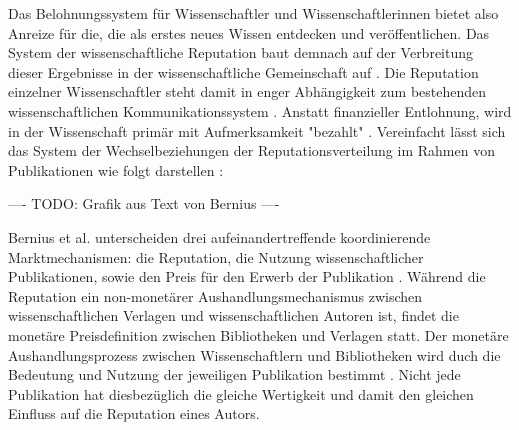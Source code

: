 Das Belohnungssystem für Wissenschaftler und Wissenschaftlerinnen bietet also Anreize für die, die als erstes neues Wissen entdecken und veröffentlichen. Das System der wissenschaftliche Reputation baut demnach auf der Verbreitung dieser Ergebnisse in der wissenschaftliche Gemeinschaft auf \cite{Fabrizio_2008}. Die Reputation einzelner Wissenschaftler steht damit in enger Abhängigkeit zum bestehenden wissenschaftlichen Kommunikationssystem \cite{suchen}. Anstatt finanzieller Entlohnung, wird in der Wissenschaft primär mit Aufmerksamkeit "bezahlt" \cite{suchen}. Vereinfacht lässt sich das System der Wechselbeziehungen der Reputationsverteilung im Rahmen von Publikationen wie folgt darstellen \cite{cite:21a}:

---- TODO: Grafik aus Text von Bernius ----

Bernius et al. unterscheiden drei aufeinandertreffende koordinierende Marktmechanismen: die Reputation, die Nutzung wissenschaftlicher Publikationen, sowie den Preis für den Erwerb der Publikation \cite{suchen}. Während die Reputation ein non-monetärer Aushandlungsmechanismus zwischen wissenschaftlichen Verlagen und wissenschaftlichen Autoren ist, findet die monetäre Preisdefinition zwischen Bibliotheken und Verlagen statt. Der monetäre Aushandlungsprozess zwischen Wissenschaftlern und Bibliotheken wird duch die Bedeutung und Nutzung der jeweiligen Publikation bestimmt \cite{cite:21a}. Nicht jede Publikation hat diesbezüglich die gleiche Wertigkeit \cite{suchen} und damit den gleichen Einfluss auf die Reputation eines Autors.

